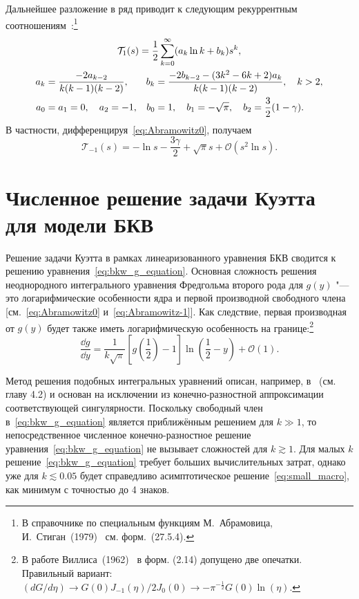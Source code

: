 Дальнейшее разложение в ряд приводит к следующим рекуррентным
соотношениям~\cite{Abramowitz1953,Abramowitz1972}:\footnote{
    В справочнике по специальным функциям М.~Абрамовица, И.~Стиган~(1979)~\cite{Abramowitz1972}
    см. форм.~(27.5.4).
}
\begin{gather}\label{eq:Abramowitz1-full}
    \mathcal{T}_1(s) = \frac12\sum_{k=0}^\infty ( a_k \ln{k} + b_k ) s^k, \\
    \begin{alignedat}{2}
        a_k &= \frac{-2a_{k-2}}{k(k-1)(k-2)}, &\quad b_k &= \frac{-2b_{k-2} - (3k^2-6k+2)a_k}{k(k-1)(k-2)}, \quad k>2, \\
        a_0 &= a_1 = 0, \quad a_2 = -1, &\quad b_0 &= 1, \quad b_1 = -\sqrt\pi, \quad b_2 = \frac32(1-\gamma).
    \end{alignedat} \notag
\end{gather}
В частности, дифференцируя~\eqref{eq:Abramowitz0}, получаем
\begin{equation}\label{eq:Abramowitz-1}
    \mathcal{T}_{-1}(s) = - \ln{s} - \frac{3\gamma}2 + \sqrt\pi s + \mathcal{O}(s^2\ln{s}).
\end{equation}

\section{Численное решение задачи Куэтта для модели БКВ}\label{sec:numerical_bkw}

Решение задачи Куэтта в рамках линеаризованного уравнения БКВ
сводится к решению уравнения~\eqref{eq:bkw_g_equation}.
Основная сложность решения неоднородного интегрального уравнения Фредгольма второго рода для \(g(y)\)
"--- это логарифмические особенности ядра и первой производной свободного члена
[см.~\eqref{eq:Abramowitz0} и~\eqref{eq:Abramowitz-1}].
Как следствие, первая производная от \(g(y)\)
будет также иметь логарифмическую особенность на границе:\footnote{
    В работе Виллиса~(1962)~\cite{Willis1962} в форм. (2.14) допущено две опечатки.
    Правильный вариант: \( (dG/d\eta) \to G(0)J_{-1}(\eta)/2J_0(0) \to -\pi^{-\frac12}G(0)\ln(\eta)\).
}
\begin{equation}
    \frac{\dd{g}}{\dd{y}} = \frac1{k\sqrt\pi}\left[g\left(\frac12\right)-1\right]\ln\left(\frac12-y\right) + \mathcal{O}(1).
\end{equation}

Метод решения подобных интегральных уравнений описан, например, в~\cite{Atkinson1997}
(см. главу 4.2) и основан на исключении из конечно-разностной аппроксимации
соответствующей сингулярности.
Поскольку свободный член в~\eqref{eq:bkw_g_equation} является приближённым решением для \(k\gg1\),
то непосредственное численное конечно-разностное решение уравнения~\eqref{eq:bkw_g_equation}
не вызывает сложностей для \(k\gtrsim1\). Для малых \(k\) решение~\eqref{eq:bkw_g_equation}
требует больших вычислительных затрат, однако уже для \(k \lesssim 0.05\) будет справедливо
асимптотическое решение~\eqref{eq:small_macro}, как минимум с точностью до 4 знаков.

